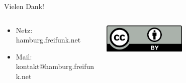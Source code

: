 \documentclass[c]{beamer}
\begin{document}
\begin{frame}{Vielen Dank!}
	\begin{columns}
		\begin{column}{0.6\textwidth}
			\begin{itemize}
				\item Netz: hamburg.freifunk.net
				\item Mail: kontakt@hamburg.freifunk.net
		\end{itemize}
		\end{column}
		\begin{column}{0.5\textwidth}
			\begin{center}
				\includegraphics[width=0.5\textwidth]{cc-by}
			\end{center}
		\end{column}
	\end{columns}
\end{frame}
\end{document}
